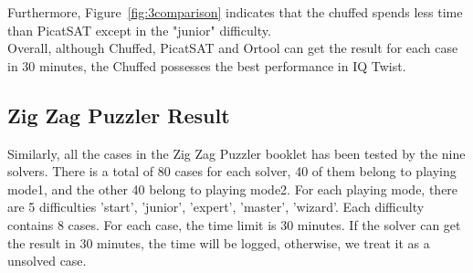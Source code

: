 Furthermore, Figure~\ref{fig:3comparison} indicates that the chuffed spends less time than PicatSAT except in the "junior" difficulty.
\\Overall, although Chuffed, PicatSAT and Ortool can get the result for each case in 30 minutes, the Chuffed possesses the best performance in IQ Twist.
\subsection{Zig Zag Puzzler Result}
\label{sec:Zig Zag Puzzlerresult}
Similarly, all the cases in the Zig Zag Puzzler booklet has been tested by the nine solvers. There is a total of 80 cases for each solver, 40 of them belong to playing mode1, and the other 40 belong to playing mode2. For each playing mode, there are 5 difficulties 'start', 'junior', 'expert', 'master', 'wizard'. Each difficulty contains 8 cases. For each case, the time limit is 30 minutes. If the solver can get the result in 30 minutes, the time will be logged, otherwise, we treat it as a unsolved case.
